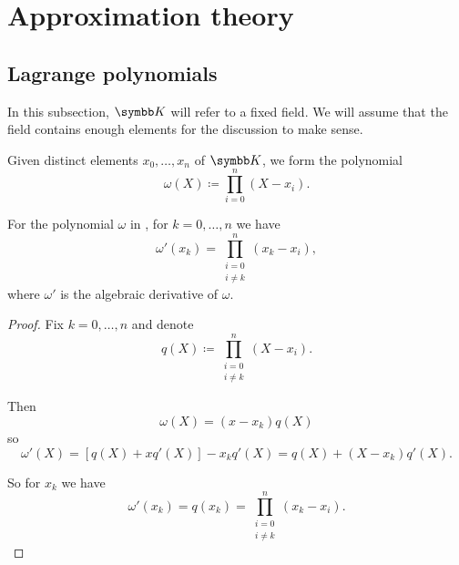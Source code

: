 \section{Approximation theory}\label{sec:approximation_theory}
\subsection{Lagrange polynomials}\label{subsec:lagrange_polynomials}

In this subsection, \( \BK \) will refer to a fixed field. We will assume that the field contains enough elements for the discussion to make sense.

\begin{definition}\label{def:omega_polynomial}
  Given distinct elements \( x_0, \ldots, x_n \) of \( \BK \), we form the polynomial
  \begin{equation*}
    \omega(X) \coloneqq \prod_{i=0}^n (X - x_i).
  \end{equation*}
\end{definition}

\begin{proposition}\label{def:omega_polynomial_derivative}
  For the polynomial \( \omega \) in , for \( k = 0, \ldots, n \) we have
  \begin{equation*}
    \omega'(x_k) = \prod_{\substack{i = 0 \\ i \neq k}}^n (x_k - x_i),
  \end{equation*}
  where \( \omega' \) is the algebraic derivative of \( \omega \).
\end{proposition}
\begin{proof}
  Fix \( k = 0, \ldots, n \) and denote
  \begin{equation*}
    q(X) \coloneqq \prod_{\substack{i = 0 \\ i \neq k}}^n (X - x_i).
  \end{equation*}

  Then
  \begin{equation*}
    \omega(X) = (x - x_k) q(X)
  \end{equation*}
  so
  \begin{equation*}
    \omega'(X) = [q(X) + x q'(X)] - x_k q'(X) = q(X) + (X - x_k) q'(X).
  \end{equation*}

  So for \( x_k \) we have
  \begin{equation*}
    \omega'(x_k) = q(x_k) = \prod_{\substack{i = 0 \\ i \neq k}}^n (x_k - x_i).
  \end{equation*}
\end{proof}


